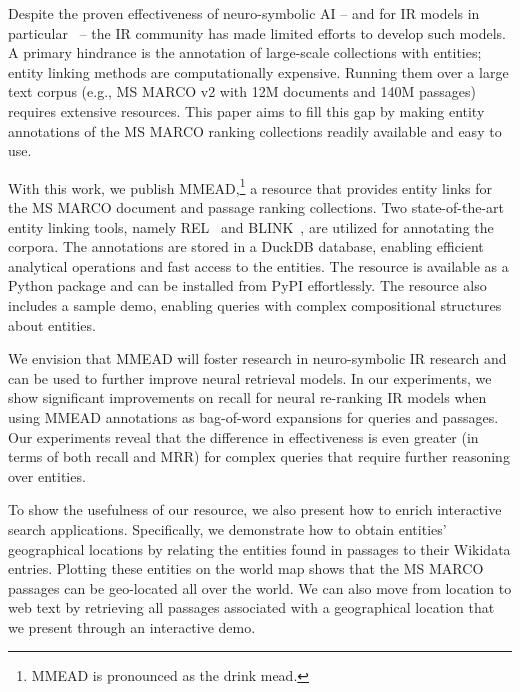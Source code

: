 Despite the proven effectiveness of neuro-symbolic AI -- and for IR models in particular~\citep{Tran:2022:DRE, Gerritse:2022:EMBERT, chatterjee2022bert} -- the IR community has made limited efforts to develop such models. A primary hindrance is the annotation of large-scale collections with entities; entity linking methods are computationally expensive. Running them over a large text corpus (e.g., MS MARCO v2 with 12M documents and 140M passages) requires extensive resources. This paper aims to fill this gap by making entity annotations of the MS MARCO ranking collections readily available and easy to use.

With this work, we publish MMEAD,\footnote{MMEAD is pronounced as the drink mead.} a resource that provides entity links for the MS MARCO document and passage ranking collections. Two state-of-the-art entity linking tools, namely REL~\citep{rel, rebl} and BLINK~\citep{blink}, are utilized for annotating the corpora. The annotations are stored in a DuckDB database, enabling efficient analytical operations and fast access to the entities. The resource is available as a Python package and can be installed from PyPI effortlessly. The resource also includes a sample demo, enabling queries with complex compositional structures about entities. 

We envision that MMEAD will foster research in neuro-symbolic IR research and can be used to further improve neural retrieval models. In our experiments, we show significant improvements on recall for neural re-ranking IR models when using MMEAD annotations as bag-of-word expansions for queries and passages. Our experiments reveal that the difference in effectiveness is even greater (in terms of both recall and MRR) for complex queries that require further reasoning over entities.

To show the usefulness of our resource, we also present how to enrich interactive search applications. Specifically, we demonstrate how to obtain entities' geographical locations by relating the entities found in passages to their Wikidata entries. Plotting these entities on the world map shows that the MS MARCO passages can be geo-located all over the world.
We can also move from location to web text by retrieving all passages associated with a geographical location that we present through an interactive demo.    



